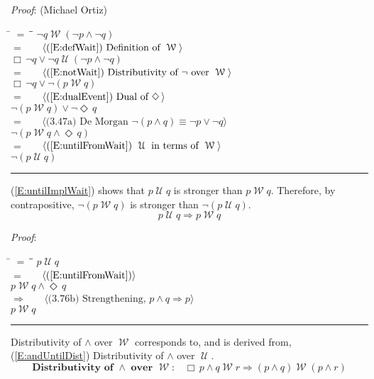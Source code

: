 \documentclass[12pt, fleqn, leqno]{article}
\newcommand{\lgap}{2pt}                             %
\newcommand{\mymathindent}{24pt}                    %
\newcommand{\impl}{\ensuremath{\Rightarrow}}        %
\newcommand{\Until}{\;\mathcal{U}\;}
\newcommand{\Wait}{\;\mathcal{W}\;}
\newcommand{\Event}{\Diamond\,}
\newcommand{\Always}{\Box\,}
\newcommand{\myqed}{\rule[-.23ex]{1.2ex}{2.0ex}}
\newcommand{\myqedtab}{\hspace{384pt}}              %
\newcommand{\Gll} {\langle}                         %
\newcommand{\Ggg} {\rangle}                         %
\newcommand{\Hint}[1]     {\ \ \ $\Gll              \mbox{#1} \Ggg$ }   %
\begin{document}
\emph{Proof}: (Michael Ortiz)
\begin{tabbing}
\hspace{\mymathindent} \= $= \;$ \= \myqedtab \= \kill
\> \> $\neg q \Wait (\neg p \land \neg q)$\\[\lgap]
\> $=$ \> \Hint{(\ref{E:defWait}) Definition of $\Wait$} \\[\lgap]
\> \> $\Always\neg q \lor \neg q\Until (\neg p \land \neg q)$\\[\lgap]
\> $=$ \> \Hint{(\ref{E:notWait}) Distributivity of $\neg$ over $\Wait$} \\[\lgap]
\> \> $\Always\neg q \lor \neg (p \Wait q)$\\[\lgap]
\> $=$  \>  \Hint{(\ref{E:dualEvent}) Dual of $\Event$}\\[\lgap]
\> \> $\neg (p \Wait q) \lor \neg\Event q $\\[\lgap]
\> $=$  \>  \Hint{(3.47a) De Morgan $\neg (p \land q) \equiv \neg p \lor \neg q$}\\[\lgap]
\> \> $\neg (p \Wait q \land \Event q)$\\[\lgap]
\> $=$  \>  \Hint{(\ref{E:untilFromWait}) $\Until$ in terms of $\Wait$}\\[\lgap]
\> \> $\neg (p \Until q)$ \quad \myqed
\end{tabbing}

(\ref{E:untilImplWait}) shows that $p\Until q$ is stronger than $p\Wait q$.
Therefore, by contrapositive, $\neg (p \Wait q)$ is stronger than $\neg (p \Until q)$.
\begin{equation}\label{E:untilImplWait}
p\Until q\impl p\Wait q
\end{equation}

\emph{Proof}:
\begin{tabbing}
\hspace{\mymathindent} \= $= \;$ \= \myqedtab \= \kill
\> \> $p\Until q$\\[\lgap]
\> $=$ \> \Hint{(\ref{E:untilFromWait})} \\[\lgap]
\> \> $p \Wait q\land \Event q$\\[\lgap]
\> $\impl$ \> \Hint{(3.76b) Strengthening, $p\land q \impl p$} \\[\lgap]
\> \> $p \Wait q$ \quad \myqed
\end{tabbing}

Distributivity of $\land$ over $\Wait$ corresponds to, and is derived from, (\ref{E:andUntilDist}) Distributivity of $\land$ over $\Until$.
\begin{equation}\label{E:andWaitDist}
\textbf{Distributivity of $\land$ over $\Wait$:}\quad \Always p \land q \Wait r \impl (p \land q) \Wait (p \land r)
\end{equation}
\end{document}
